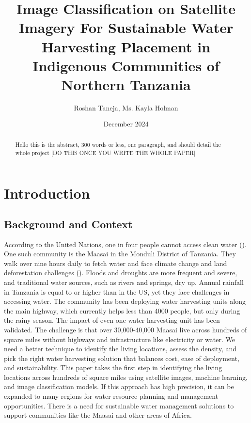 \documentclass[10pt]{article}
\title{Image Classification on Satellite Imagery For Sustainable Water Harvesting Placement in Indigenous Communities of Northern Tanzania}
\author{Roshan Taneja, Ms. Kayla Holman}
\date{December 2024}
\begin{document}
\maketitle

\begin{abstract}
Hello this is the abstract, 300 words or less, one paragraph, and should detail the whole project [DO THIS ONCE YOU WRITE THE WHOLE PAPER]
\end{abstract}

\section{Introduction}

\subsection{Background and Context}

According to the United Nations, one in four people cannot access clean water (\autocite{United_Nations}). One such community is the Maasai in the Monduli District of Tanzania. They walk over nine hours daily to fetch water and face climate change and land deforestation challenges (\autocite{taneja2024impact}). Floods and droughts are more frequent and severe, and traditional water sources, such as rivers and springs, dry up. Annual rainfall in Tanzania is equal to or higher than in the US, yet they face challenges in accessing water. The community has been deploying water harvesting units along the main highway, which currently helps less than 4000 people, but only during the rainy season. The impact of even one water harvesting unit has been validated. The challenge is that over 30,000-40,000 Maasai live across hundreds of square miles without highways and infrastructure like electricity or water. We need a better technique to identify the living locations, assess the density, and pick the right water harvesting solution that balances cost, ease of deployment, and sustainability. This paper takes the first step in identifying the living locations across hundreds of square miles using satellite images, machine learning, and image classification models. If this approach has high precision, it can be expanded to many regions for water resource planning and management opportunities.  There is a need for sustainable water management solutions to support communities like the Maasai and other areas of Africa.
\end{document}

